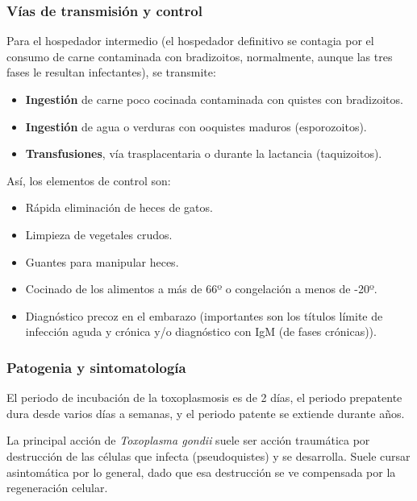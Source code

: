 \subsubsection{Vías de transmisión y control}
Para el hospedador intermedio (el hospedador definitivo se contagia por el consumo de carne contaminada con bradizoitos, normalmente, aunque las tres fases le resultan infectantes), se transmite:
\begin{itemize}[itemsep=0pt,parsep=0pt,topsep=0pt,partopsep=0pt]
	\item \textbf{Ingestión} de carne poco cocinada contaminada con quistes con bradizoitos.
	\item \textbf{Ingestión} de agua o verduras con ooquistes maduros (esporozoitos).
	\item \textbf{Transfusiones}, vía trasplacentaria o durante la lactancia (taquizoitos).
\end{itemize}

Así, los elementos de control son:
\begin{itemize}[itemsep=0pt,parsep=0pt,topsep=0pt,partopsep=0pt]
	\item Rápida eliminación de heces de gatos.
	\item Limpieza de vegetales crudos.
	\item Guantes para manipular heces.
	\item Cocinado de los alimentos a más de 66º o congelación a menos de -20º.
	\item Diagnóstico precoz en el embarazo (importantes son los títulos límite de infección aguda y crónica y/o diagnóstico con IgM (de fases crónicas)).
\end{itemize}
\subsubsection{Patogenia y sintomatología}
El periodo de incubación de la toxoplasmosis es de 2 días, el periodo prepatente dura desde varios días a semanas, y el periodo patente se extiende durante años. 

La principal acción de \textit{Toxoplasma gondii} suele ser acción traumática por destrucción de las células que infecta (pseudoquistes) y se desarrolla. Suele cursar asintomática por lo general, dado que esa destrucción se ve compensada por la regeneración celular.

